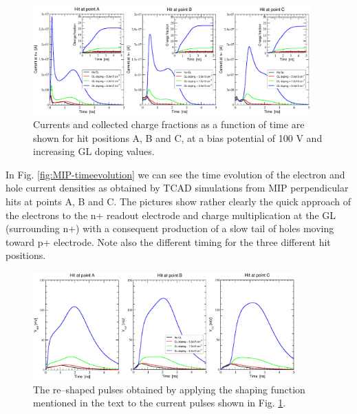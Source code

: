 \documentclass[aps,pt14,superscriptaddress,showpacs,floatfix,nofootinbib]{revtex4}
\begin{document}
\begin{figure}[hbtp]
\begin{center}
\includegraphics[width=0.95\textwidth,keepaspectratio]{figures1/MIP-ABC-CCE-new.pdf}
\caption{Currents and collected charge fractions as a function of time are shown for hit positions A, B and C, at a bias potential of 100 V and increasing GL doping values.\label{fig:MIP-ABC-CCE-new}}  
\end{center}
\end{figure}

In Fig. \ref{fig:MIP-timeevolution} we can see the time evolution of the electron and hole current densities as obtained by TCAD simulations from MIP perpendicular hits at points A, B and C. The pictures show rather clearly the quick approach of the electrons to the n+ readout electrode and charge multiplication at the GL (surrounding n+) with a consequent production of a slow tail of holes moving toward p+ electrode. Note also the different timing for the three different hit positions.    
 
\begin{figure}[hbtp]
\begin{center}
\includegraphics[width=0.90\textwidth,keepaspectratio]{figures1/Shaped_pulses_new.pdf}
\caption{The re--shaped pulses obtained by applying the shaping function mentioned in the text to the current pulses shown in Fig. \ref{fig:MIP-ABC-CCE-new}.\label{fig:Shaped}}
\end{center}
\end{figure}
\end{document}
